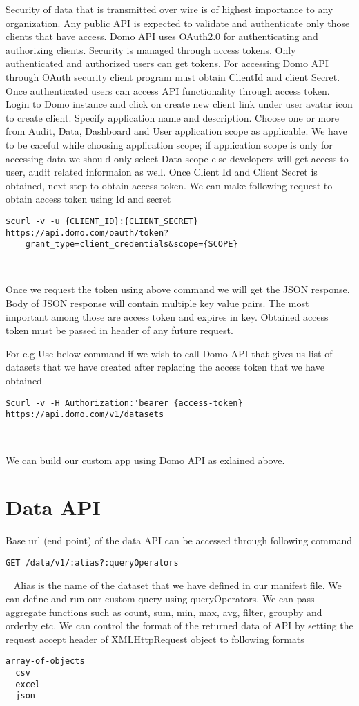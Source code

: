Security of data that is transmitted over wire is of highest
importance to any organization. Any public API is expected to 
validate and authenticate only those clients that have access.
Domo API uses OAuth2.0 for authenticating and authorizing clients.
 Security is managed through access tokens. Only authenticated
and authorized users can get tokens. For accessing Domo API through
OAuth security client program must obtain ClientId and client Secret.
 Once authenticated users can access API functionality through access
token.
Login to Domo instance and click on create new client link under user 
avatar icon to create client. Specify application name and
description. Choose one or more from Audit, Data, Dashboard and User
application scope as applicable. We have to be careful while choosing
application scope; if application scope is only for accessing data we
should only select Data scope else developers will get access to user,
 audit related informaion as well. Once Client Id and Client Secret is
obtained, next step to obtain access token. We can make following request
to obtain access token using Id and secret~\cite{hid-sp18-523-Authticate}
\begin{verbatim}
$curl -v -u {CLIENT_ID}:{CLIENT_SECRET} 
https://api.domo.com/oauth/token?
	grant_type=client_credentials&scope={SCOPE}
\end{verbatim}
~\cite{hid-sp18-523-Authticate}

Once we request the token using above command we will get the JSON response.
 Body of JSON response will contain multiple key value pairs. The most
important among those are access token and expires in key. Obtained access 
token must be passed in header of any future request.

For e.g Use below command if we wish to call Domo API that gives us list of 
datasets that we have created after replacing the access token that we have
obtained
\begin{verbatim}
$curl -v -H Authorization:'bearer {access-token} 
https://api.domo.com/v1/datasets
\end{verbatim}
~\cite{hid-sp18-523-Authticate}

We can build our custom app using Domo API as exlained above.


\section{Data API}
Base url (end point) of the data API can be accessed through following
command
\begin{verbatim}
GET /data/v1/:alias?:queryOperators
\end{verbatim}
~\cite{hid-sp18-523-DataApi}
Alias is the name of the dataset that we have defined in our manifest
file. We can define and run our custom query using queryOperators. We can
pass aggregate functions such as count, sum, min, max, avg, filter, 
groupby and orderby etc. We can control the format of the returned data 
of API by setting the request accept header of XMLHttpRequest object 
to following formats~\cite{hid-sp18-523-DataApi} 
\begin{verbatim}
array-of-objects
  csv
  excel
  json
\end{verbatim}
~\cite{hid-sp18-523-DataApi}

